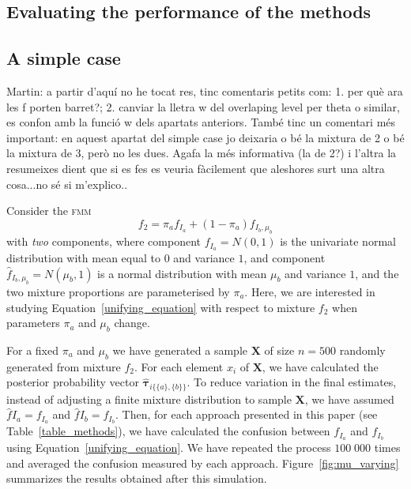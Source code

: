 \documentclass[10pt, a4paper]{article}
\newcommand{\m}[1]{\boldsymbol{#1}}
\newcommand{\fmm}{\textsc{fmm}\xspace}
\begin{document}
\begin{spacing}{1.9}
\section{Evaluating the performance of the methods}
\label{comparison}

\subsection{A simple case}

{\color{blue} Martin: a partir d'aquí no he tocat res, tinc comentaris petits com: 1. per què ara les f porten barret?; 2. canviar la lletra w del overlaping level per theta o similar, es confon amb la funció w dels apartats anteriors. També tinc un comentari més important: en aquest apartat del simple case jo deixaria o bé la mixtura de 2 o bé la mixtura de 3, però no les dues. Agafa la més informativa (la de 2?) i l'altra la resumeixes dient que si es fes es veuria fàcilement que aleshores surt una altra cosa...no sé si m'explico..}

Consider the \fmm
\begin{equation}\label{two_mixture}
f_2 = \pi_a f_{I_a} + (1 - \pi_a) f_{I_b, \mu_b}
\end{equation}
with \emph{two} components, where component $f_{I_a} = N(0, 1)$ is the univariate normal distribution with mean equal to $0$ and variance $1$, and component $\hat{f}_{I_b, \mu_b} = N(\mu_b, 1)$ is a normal distribution with mean $\mu_b$ and variance $1$, and the two mixture proportions are parameterised by $\pi_a$. Here, we are interested in studying Equation~\ref{unifying_equation} with respect to mixture $f_2$ when parameters $\pi_a$ and $\mu_b$ change. 

For a fixed $\pi_a$ and $\mu_b$ we have generated a sample $\m X$ of size $n=500$ randomly generated from mixture $f_2$. For each element $x_i$ of $\m X$, we have calculated the posterior probability vector $\hat{\m \tau}_{i \{\{a\},\{b\}\}}$. To reduce variation in the final estimates,  instead of adjusting a finite mixture distribution to  sample $\m X$, we have assumed $\hat{f}{I_a} = f_{I_a}$ and $\hat{f}{I_b} = f_{I_b}$. Then, for each approach presented in this paper (see  Table~\ref{table_methods}), we have calculated the confusion between $f_{I_a}$ and $f_{I_b}$ using Equation~\ref{unifying_equation}. We have repeated the process $100\;000$ times and averaged the confusion measured by each approach. Figure~\ref{fig:mu_varying} summarizes the results obtained after this simulation.


\end{spacing}
\end{document}
